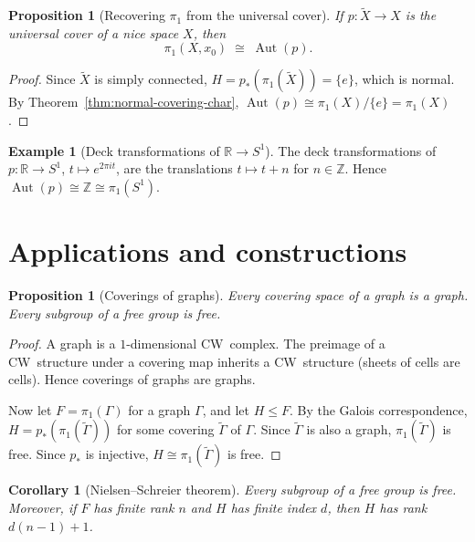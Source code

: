 \documentclass[12pt,a4paper,openany]{book}
\theoremstyle{definition}
\newtheorem{example}[definition]{Example}
\theoremstyle{plain}
\newtheorem{proposition}[definition]{Proposition}
\newtheorem{corollary}[definition]{Corollary}
\theoremstyle{remark}
\newcommand{\Z}{\mathbb{Z}}
\newcommand{\R}{\mathbb{R}}
\DeclareMathOperator{\Aut}{Aut}
\begin{document}
\begin{proposition}[Recovering $\pi_1$ from the universal cover]\label{prop:pi1-from-universal}
  If $p\colon \widetilde{X} \to X$ is the universal cover of a nice space $X$,
  then
  \[
    \pi_1(X, x_0) \;\cong\; \Aut(p).
  \]
\end{proposition}

\begin{proof}
  Since $\widetilde{X}$ is simply connected,
  $H = p_*(\pi_1(\widetilde{X})) = \{e\}$, which is normal.  By
  Theorem~\ref{thm:normal-covering-char},
  $\Aut(p) \cong \pi_1(X)/\{e\} = \pi_1(X)$.
\end{proof}

\begin{example}[Deck transformations of $\R \to S^1$]\label{ex:deck-R-S1}
  \index{deck transformation!of $\R \to S^1$}
  The deck transformations of $p\colon \R \to S^1$, $t \mapsto e^{2\pi i t}$,
  are the translations $t \mapsto t + n$ for $n \in \Z$.  Hence
  $\Aut(p) \cong \Z \cong \pi_1(S^1)$.
\end{example}

\section{Applications and constructions}\label{sec:covering-applications}

\begin{proposition}[Coverings of graphs]\label{prop:covering-graphs}
  Every covering space of a graph is a graph.  Every subgroup of a free group
  is free.
\end{proposition}

\begin{proof}
  A graph is a $1$-dimensional CW~complex.  The preimage of a CW~structure
  under a covering map inherits a CW~structure (sheets of cells are cells).
  Hence coverings of graphs are graphs.

  Now let $F = \pi_1(\Gamma)$ for a graph $\Gamma$, and let $H \leq F$.  By
  the Galois correspondence, $H = p_*(\pi_1(\widetilde{\Gamma}))$ for some
  covering $\widetilde{\Gamma}$ of $\Gamma$.  Since $\widetilde{\Gamma}$ is
  also a graph, $\pi_1(\widetilde{\Gamma})$ is free.  Since $p_*$ is
  injective, $H \cong \pi_1(\widetilde{\Gamma})$ is free.
\end{proof}

\begin{corollary}[Nielsen--Schreier theorem]\label{cor:nielsen-schreier}
  Every subgroup of a free group is free.  Moreover, if $F$ has finite rank $n$
  and $H$ has finite index $d$, then $H$ has rank $d(n-1) + 1$.
\end{corollary}
\end{document}
